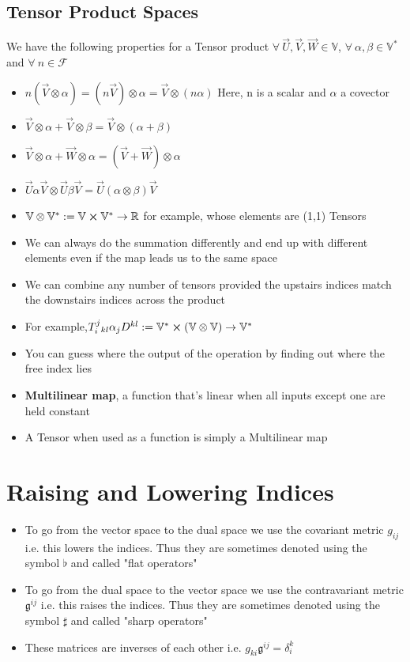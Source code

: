 \subsection{Tensor Product Spaces}
We have the following properties for a Tensor product $\forall \ \vec{U},\vec{V},\vec{W} \in \mathbb{V}$, $\forall \ \alpha, \beta \in \mathbb{V}^{*}$ and $\forall \ n \in \mathcal{F}$
\begin{itemize}
\item $n(\vec{V} \otimes \alpha) = (n\vec{V}) \otimes \alpha = \vec{V} \otimes (n\alpha)$ Here, n is a scalar and $\alpha$ a covector
\item $\vec{V} \otimes \alpha + \vec{V} \otimes \beta = \vec{V}\otimes(\alpha + \beta)$
\item $\vec{V} \otimes \alpha + \vec{W} \otimes \alpha = (\vec{V} + \vec{W}) \otimes \alpha$
\item $\vec{U}\alpha\vec{V} \otimes \vec{U}\beta\vec{V} = \vec{U}(\alpha \otimes \beta)\vec{V}$
\item $\mathbb{V} \otimes \mathbb{V}^{*} := \mathbb{V} \cross \mathbb{V}^{*} \rightarrow \mathbb{R} $ for example, whose elements are (1,1) Tensors
\item We can always do the summation differently and end up with different elements even if the map leads us to the same space
\item We can combine any number of tensors provided the upstairs indices match the downstairs indices across the product 
\item For example,$T^{j}_{i} {}_{kl} \alpha_{j}D^{kl} := \mathbb{V}^{*} \cross (\mathbb{V} \otimes \mathbb{V}) \rightarrow \mathbb{V}^{*}$
\item You can guess where the output of the operation by finding out where the free index lies
\item \textbf{Multilinear map}, a function that's linear when all inputs except one are held constant
\item A Tensor when used as a function is simply a Multilinear map
\end{itemize}

\section{Raising and Lowering Indices}
\begin{itemize}
\item To go from the vector space to the dual space we use the covariant metric $g_{ij}$ i.e. this lowers the indices. Thus they are sometimes denoted using the symbol $\flat$ and called "flat operators"
\item To go from the dual space to the vector space we use the contravariant metric $\mathfrak{g}^{ij}$ i.e. this raises the indices. Thus they are sometimes denoted using the symbol $\sharp$ and called "sharp operators"
\item These matrices are inverses of each other i.e. $g_{ki} \mathfrak{g}^{ij} = \delta^{k}_{i}$
\end{itemize}





